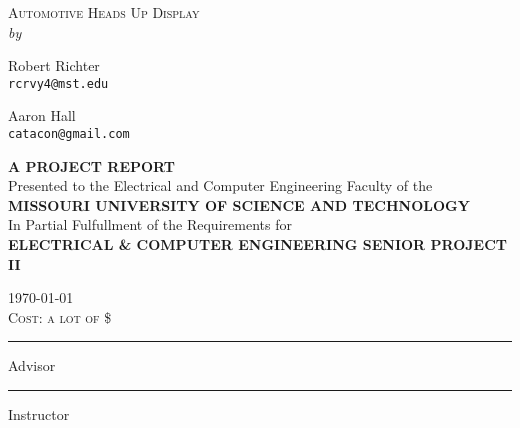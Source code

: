 \begin{titlepage}

\begin{center}
\textsc{\LARGE Automotive Heads Up Display} \\[2cm]

\textit{by} \\[0.5cm]

\begin{multicols}{2}
Robert Richter\\
\texttt{rcrvy4@mst.edu}\\

\columnbreak

Aaron Hall\\
\texttt{catacon@gmail.com}
\end{multicols}

\vspace{3 cm}

\textsc{\small \textbf{A PROJECT REPORT}} \\[0.5cm]
{\small Presented to the Electrical and Computer Engineering Faculty of the} \\[0.5cm]
\textsc{\small \textbf{MISSOURI UNIVERSITY OF SCIENCE AND TECHNOLOGY}} \\[0.5cm]
{\small In Partial Fulfullment of the Requirements for} \\[0.5cm]
\textsc{\small \textbf{ELECTRICAL \& COMPUTER ENGINEERING SENIOR PROJECT II}} \\[1cm]

\vfill

\textsc{\today} \\[3mm]
\textsc{Cost: a lot of \$} \\[2cm]

\begin{multicols}{2}
\hrule
\vspace{1mm}
Advisor\\
\columnbreak
\hrule
\vspace{1mm}
Instructor
\end{multicols}

\end{center}
\end{titlepage}